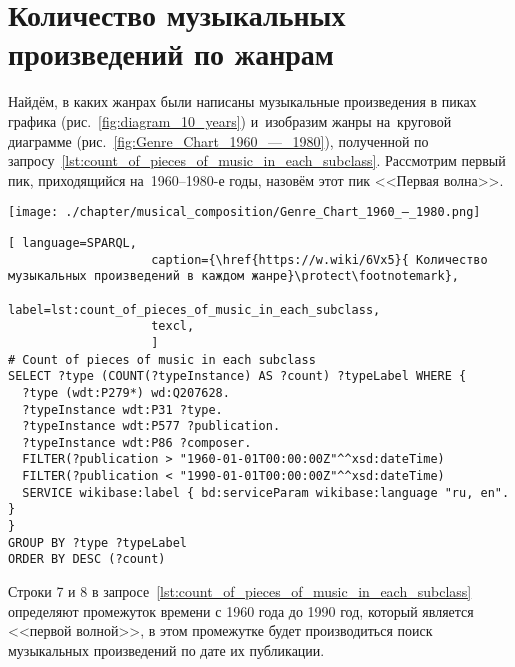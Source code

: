 \newpage
\section{Количество музыкальных произведений по жанрам}

Найдём, в каких жанрах были написаны музыкальные произведения 
в пиках графика (рис.~\ref{fig:diagram_10_years}) 
и~изобразим жанры на~круговой диаграмме (рис.~\ref{fig:Genre_Chart_1960_—_1980}), 
полученной по запросу~\ref{lst:count_of_pieces_of_music_in_each_subclass}. 
Рассмотрим первый пик, приходящийся на~1960--1980-е годы, назовём этот пик <<Первая волна>>.

\begin{marginfigure}[0\baselineskip]
	\texttt{[image: ./chapter/musical\_composition/Genre\_Chart\_1960\_—\_1980.png]}
	\caption[Круговая диаграмма музыкальных жанров за 1960--1980 годы во всем мире]{Круговая диаграмма музыкальных жанров за 1960--1980 годы во всем мире. Ссылка на SPARQL-запрос: \href{https://w.wiki/6Vx5}{https://w.wiki/6Vx5}.}%
	\label{fig:Genre_Chart_1960_—_1980}%
\end{marginfigure}

\begin{lstlisting}[ language=SPARQL,
                    caption={\href{https://w.wiki/6Vx5}{ Количество музыкальных произведений в каждом жанре}\protect\footnotemark},
                    label=lst:count_of_pieces_of_music_in_each_subclass,
                    texcl,
                    ]
# Count of pieces of music in each subclass
SELECT ?type (COUNT(?typeInstance) AS ?count) ?typeLabel WHERE {
  ?type (wdt:P279*) wd:Q207628.
  ?typeInstance wdt:P31 ?type.
  ?typeInstance wdt:P577 ?publication.
  ?typeInstance wdt:P86 ?composer.
  FILTER(?publication > "1960-01-01T00:00:00Z"^^xsd:dateTime)        
  FILTER(?publication < "1990-01-01T00:00:00Z"^^xsd:dateTime)
  SERVICE wikibase:label { bd:serviceParam wikibase:language "ru, en". }
}
GROUP BY ?type ?typeLabel
ORDER BY DESC (?count)
\end{lstlisting}%

Строки 7 и 8 в запросе~\ref{lst:count_of_pieces_of_music_in_each_subclass} определяют промежуток времени с 1960 года до 1990 год, который является <<первой волной>>, в этом промежутке будет производиться поиск музыкальных произведений по дате их публикации.


